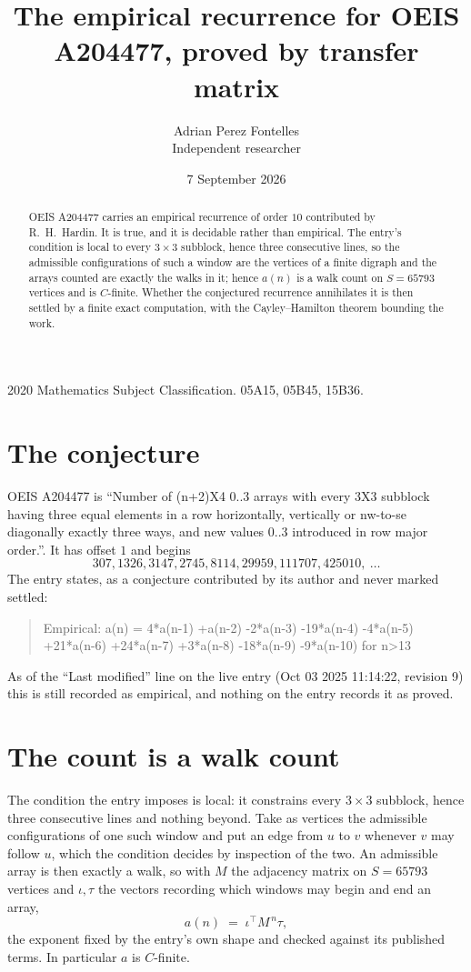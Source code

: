 \documentclass[11pt,a4paper]{article}
\title{The empirical recurrence for OEIS A204477, proved by transfer matrix}
\author{Adrian Perez Fontelles\\ \small Independent researcher}
\date{7 September 2026}
\theoremstyle{plain}
\theoremstyle{definition}
\begin{document}
\maketitle

\begin{abstract}
OEIS A204477 carries an empirical recurrence of order $10$ contributed by R.~H.~Hardin. It is
true, and it is decidable rather than empirical. The entry's condition is local to every $3\times3$ subblock, hence three consecutive lines, so
the admissible configurations of such a window are the vertices of a finite digraph and the
arrays counted are exactly the walks in it; hence $a(n)$ is a walk count on $S=65793$ vertices
and is $C$-finite. Whether the conjectured recurrence annihilates it is then settled by a
finite exact computation, with the Cayley--Hamilton theorem bounding the work.
\end{abstract}

\noindent\small 2020 Mathematics Subject Classification. 05A15, 05B45, 15B36.\normalsize

\section{The conjecture}

OEIS A204477 is ``Number of (n+2)X4 0..3 arrays with every 3X3 subblock having three equal elements in a row horizontally, vertically or nw-to-se diagonally exactly three ways, and new values 0..3 introduced in row major order.''. It has offset $1$ and begins
\[
307, 1326, 3147, 2745, 8114, 29959, 111707, 425010,\ \dots
\]
The entry states, as a conjecture contributed by its author and never marked settled:
\begin{quote}
Empirical: a(n) = 4*a(n-1) +a(n-2) -2*a(n-3) -19*a(n-4) -4*a(n-5) +21*a(n-6) +24*a(n-7) +3*a(n-8) -18*a(n-9) -9*a(n-10) for n>13
\end{quote}
As of the ``Last modified'' line on the live entry (Oct 03 2025 11:14:22, revision 9) this is still
recorded as empirical, and nothing on the entry records it as proved.

\section{The count is a walk count}

The condition the entry imposes is local: it constrains every $3\times3$ subblock, hence three consecutive lines and nothing beyond. Take as
vertices the admissible configurations of one such window and put an edge from $u$ to $v$
whenever $v$ may follow $u$, which the condition decides by inspection of the two. An
admissible array is then exactly a walk, so with $M$ the adjacency matrix on $S=65793$ vertices
and $\iota,\tau$ the vectors recording which windows may begin and end an array,
\[
a(n)\;=\;\iota^{\!\top}M^{\,n}\tau ,
\]
the exponent fixed by the entry's own shape and checked against its published terms. In
particular $a$ is $C$-finite.
\end{document}
